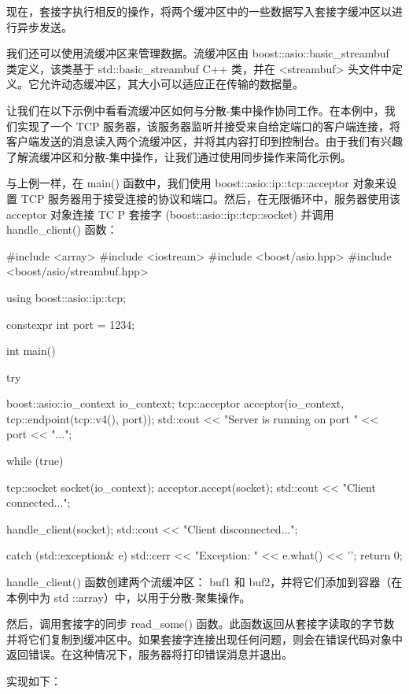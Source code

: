 现在，套接字执行相反的操作，将两个缓冲区中的一些数据写入套接字缓冲区以进行异步发送。


我们还可以使用流缓冲区来管理数据。流缓冲区由 boost::asio::basic\_streambuf 类定义，该类基于 std::basic\_streambuf C++ 类，并在 <streambuf> 头文件中定义。它允许动态缓冲区，其大小可以适应正在传输的数据量。

让我们在以下示例中看看流缓冲区如何与分散-集中操作协同工作。在本例中，我们实现了一个 TCP 服务器，该服务器监听并接受来自给定端口的客户端连接，将客户端发送的消息读入两个流缓冲区，并将其内容打印到控制台。由于我们有兴趣了解流缓冲区和分散-集中操作，让我们通过使用同步操作来简化示例。

与上例一样，在 main() 函数中，我们使用 boost::asio::ip::tcp::acceptor 对象来设置 TCP 服务器用于接受连接的协议和端口。然后，在无限循环中，服务器使用该 acceptor 对象连接 TC P 套接字 (boost::asio::ip::tcp::socket) 并调用 handle\_client() 函数：

\begin{cpp}
#include <array>
#include <iostream>
#include <boost/asio.hpp>
#include <boost/asio/streambuf.hpp>

using boost::asio::ip::tcp;

constexpr int port = 1234;

int main() {
    try {
        boost::asio::io_context io_context;
        tcp::acceptor acceptor(io_context,
                        tcp::endpoint(tcp::v4(), port));
        std::cout << "Server is running on port "
                  << port << "...\n";

        while (true) {
            tcp::socket socket(io_context);
            acceptor.accept(socket);
            std::cout << "Client connected...\n";

            handle_client(socket);
            std::cout << "Client disconnected...\n";
        }
    } catch (std::exception& e) {
        std::cerr << "Exception: " << e.what() << '\n';
    }
    return 0;
}
\end{cpp}

handle\_client() 函数创建两个流缓冲区： buf1 和 buf2，并将它们添加到容器（在本例中为 std ::array）中，以用于分散-聚集操作。

然后，调用套接字的同步 read\_some() 函数。此函数返回从套接字读取的字节数并将它们复制到缓冲区中。如果套接字连接出现任何问题，则会在错误代码对象中返回错误。在这种情况下，服务器将打印错误消息并退出。

实现如下：

